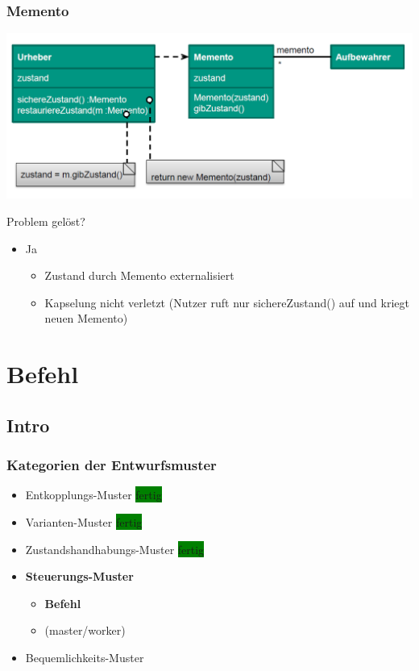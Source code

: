 \documentclass[18pt]{beamer}
\begin{document}
	\begin{frame}
		\frametitle{Memento}
		\includegraphics[scale=0.4]{./pics/tut4/mem.png}
		\begin{block}{Problem gelöst?}
			\begin{itemize}
				\pause
				\item Ja
				\begin{itemize}
					\pause
					\item Zustand durch Memento externalisiert \pause
					\item Kapselung nicht verletzt (Nutzer ruft nur sichereZustand() auf und kriegt neuen Memento)
				\end{itemize}
			\end{itemize}
		\end{block}
\end{frame}

\section{Befehl}
	\subsection{Intro}
	\begin{frame}
		\frametitle{Kategorien der Entwurfsmuster}
		\begin{itemize}
			\item Entkopplungs-Muster \colorbox{green}{fertig}
			\item Varianten-Muster \colorbox{green}{fertig}
			\item Zustandshandhabungs-Muster \colorbox{green}{fertig}
			\item \textbf{Steuerungs-Muster} 
				\begin{itemize}
					\item \textbf{Befehl}
					\item (master/worker)
				\end{itemize}
			\item Bequemlichkeits-Muster
		\end{itemize}
	\end{frame}
	
\end{document}
